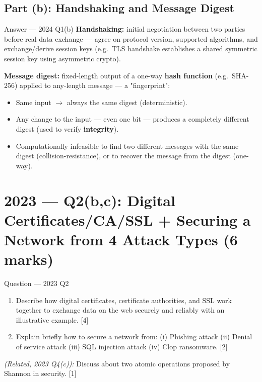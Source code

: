 \documentclass[12pt,a4paper]{article}
\begin{document}
\subsection{Part (b): Handshaking and Message Digest}
\begin{solbox}{Answer --- 2024 Q1(b)}
\textbf{Handshaking:} initial negotiation between two parties before real data exchange --- agree on protocol version, supported algorithms, and exchange/derive session keys (e.g.\ TLS handshake establishes a shared symmetric session key using asymmetric crypto).

\textbf{Message digest:} fixed-length output of a one-way \textbf{hash function} (e.g.\ SHA-256) applied to any-length message --- a "fingerprint":
\begin{itemize}[noitemsep]
  \item Same input $\to$ always the same digest (deterministic).
  \item Any change to the input --- even one bit --- produces a completely different digest (used to verify \textbf{integrity}).
  \item Computationally infeasible to find two different messages with the same digest (collision-resistance), or to recover the message from the digest (one-way).
\end{itemize}
\end{solbox}

\newpage
\section{2023 --- Q2(b,c): Digital Certificates/CA/SSL + Securing a Network from 4 Attack Types (6 marks)}

\begin{qbox}{Question --- 2023 Q2}
\begin{enumerate}[label=(\alph*)]
  \item[(b)] Describe how digital certificates, certificate authorities, and SSL work together to exchange data on the web securely and reliably with an illustrative example. \hfill [4]
  \item[(c)] Explain briefly how to secure a network from: (i) Phishing attack (ii) Denial of service attack (iii) SQL injection attack (iv) Clop ransomware. \hfill [2]
\end{enumerate}
\noindent\textit{(Related, 2023 Q4(c)):} Discuss about two atomic operations proposed by Shannon in security. \hfill [1]
\end{qbox}
\end{document}
